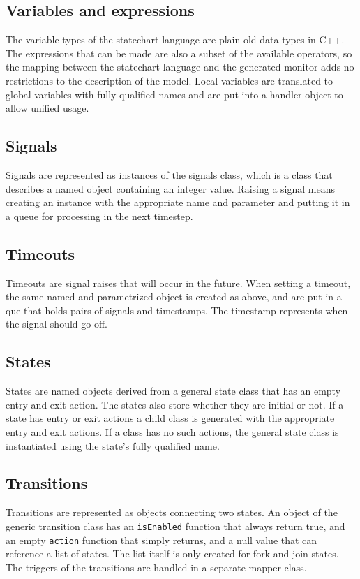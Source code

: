 {  \subsection{Variables and expressions}
The variable types of the statechart language are plain old data types in C++. The expressions that can be made are also a subset of the available operators, so the mapping between the statechart language and the generated monitor adds no restrictions to the description of the model. Local variables are translated to global variables with fully qualified names and are put into a handler object to allow unified usage.
  \subsection{Signals}
Signals are represented as instances of the signals class, which is a class that describes a named object containing an integer value. Raising a signal means creating an instance with the appropriate name and parameter and putting it in a queue for processing in the next timestep.
  \subsection{Timeouts}
Timeouts are signal raises that will occur in the future. When setting a timeout, the same named and parametrized object is created as above, and are put in a que that holds pairs of signals and timestamps. The timestamp represents when the signal should go off.
  \subsection{States}
States are named objects derived from a general state class that has an empty entry and exit action. The states also store whether they are initial or not. If a state has entry or exit actions a child class is generated with the appropriate entry and exit actions. If a class has no such actions, the general state class is instantiated using the state's fully qualified name.
  \subsection{Transitions}
Transitions are represented as objects connecting two states. An object of the generic transition class has an \verb!isEnabled! function that always return true, and an empty \verb!action! function that simply returns, and a null value that can reference a list of states. The list itself is only created for fork and join states. The triggers of the transitions are handled in a separate mapper class.
}
